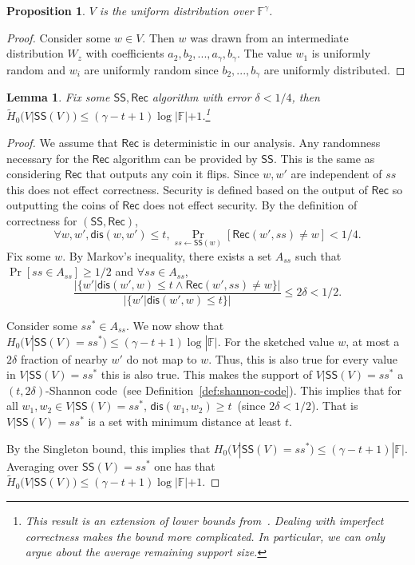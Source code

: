 \documentclass[11pt]{article}
\newcommand{\defref}[1]{\mbox{Definition~\ref{#1}}}
\newcommand{\class}[1]{{\ensuremath{\mathsf{#1}}}}
\newcommand{\sketch}{\ensuremath{\class{SS}}\xspace}
\newcommand{\rec}{\ensuremath{\class{Rec}}\xspace}
\newcommand{\dis}{\ensuremath{\mathsf{dis}}}
\newtheorem{lemma}[theorem]{Lemma}
\newtheorem{proposition}[theorem]{Proposition}
\begin{document}
\begin{proposition}
\label{prop:distribution uniform} $V$ is the uniform distribution over $\mathbb{F}^\gamma$.
\end{proposition}
\begin{proof}
Consider some $w\in V$.  Then $w$ was drawn from an intermediate distribution $W_z$ with coefficients $a_2, b_2, ..., a_\gamma , b_\gamma$.  The value $w_1$ is uniformly random and $w_i$ are uniformly random since $b_2,..., b_\gamma$ are uniformly distributed.
\end{proof}


\begin{lemma}
\label{lem:secure sketch entropy loss}
Fix some $\sketch, \rec$ algorithm with error $\delta < 1/4$, then $\tilde{H}_0(V | \sketch(V)) \le (\gamma-t+1)\log |\mathbb{F}|+1$.\footnote{This result is an extension of lower bounds from~\cite[Appendix C]{DBLP:journals/siamcomp/DodisORS08}.  Dealing with imperfect correctness makes the bound more complicated.  In particular, we can only argue about the average remaining support size.}
\end{lemma}
\begin{proof}
We assume that $\rec$ is deterministic in our analysis.  Any randomness necessary for the \rec algorithm can be provided by \sketch.  This is the same as considering $\rec$ that outputs any coin it flips.  Since $w, w'$ are independent of $ss$ this does not effect correctness.  Security is defined based on the output of $\rec$ so outputting the coins of $\rec$ does not effect security.
By the definition of correctness for $(\sketch, \rec)$, 
\[
\forall w, w', \dis(w, w') \le t, \Pr_{ss\leftarrow \sketch(w)} [\rec(w', ss) \neq w] < 1/4.
\]
Fix some $w$.  
By Markov's inequality, there exists a set $A_{ss}$ such that $\Pr[ss\in A_{ss}]\ge 1/2$ and $\forall ss\in A_{ss}$, 
\[
\frac{|\{w' | \dis (w', w)\le t \wedge \rec(w', ss) \neq w\}|}{|\{w'|\dis(w', w) \le t\}|}\le 2\delta < 1/2.\]

Consider some $ss^*\in A_{ss}$.  We now show that $H_0(V | \sketch(V) = ss^*) \le (\gamma-t+1)\log |\mathbb{F}|$.  For the sketched value $w$, at most a $2\delta$ fraction of nearby $w'$ do not map to $w$. Thus, this is also true for every value in $V|\sketch(V) = ss^*$ this is also true.    This makes the support of $V|\sketch(V)=ss^*$ a $(t, 2\delta)$-Shannon code~(see \defref{def:shannon-code}).  This implies that for all $w_1, w_2 \in V|\sketch(V)=ss^*$, $\dis(w_1, w_2)\ge t$~(since $2\delta< 1/2$).  That is $V|\sketch(V)=ss^*$ is a set with minimum distance at least $t$.  


By the Singleton bound, this implies that $H_0(V |\sketch(V)=ss^*) \le (\gamma -t+1 )|\mathbb{F}|$.  Averaging over $\sketch(V)=ss^*$ one has that $\tilde{H}_0(V|\sketch(V)) \le (\gamma -t +1) \log|\mathbb{F}| +1$.
\end{proof}
\end{document}
